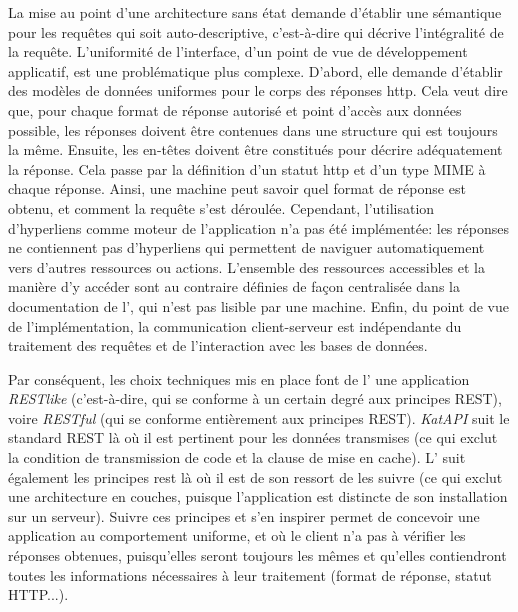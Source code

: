La mise au point d'une architecture sans état demande d'établir une sémantique pour les requêtes qui soit auto-descriptive, c'est-à-dire qui décrive l'intégralité de la requête. L'uniformité de l'interface, d'un point de vue de développement applicatif, est une problématique plus complexe. D'abord, elle demande d'établir des modèles de données uniformes pour le corps des réponses \gls{http}. Cela veut dire que, pour chaque format de réponse autorisé et point d'accès aux données possible, les réponses doivent être contenues dans une structure qui est toujours la même. Ensuite, les en-têtes doivent être constitués pour décrire adéquatement la réponse. Cela passe par la définition d'un statut \gls{http} et d'un type MIME à chaque réponse. Ainsi, une machine peut savoir quel format de réponse est obtenu, et comment la requête s'est déroulée. Cependant, l'utilisation d'hyperliens comme moteur de l'application n'a pas été implémentée: les réponses ne contiennent pas d'hyperliens qui permettent de naviguer automatiquement vers d'autres ressources ou actions. L'ensemble des ressources accessibles et la manière d'y accéder sont au contraire définies de façon centralisée dans la documentation de l'\api{}, qui n'est pas lisible par une machine. Enfin, du point de vue de l'implémentation, la communication client-serveur est indépendante du traitement des requêtes et de l'interaction avec les bases de données.

Par conséquent, les choix techniques mis en place font de l'\api{} une application \textit{RESTlike} (c'est-à-dire, qui se conforme à un certain degré aux principes REST), voire \textit{RESTful} (qui se conforme entièrement aux principes REST). \textit{KatAPI} suit le standard REST là où il est pertinent pour les données transmises (ce qui exclut la condition de transmission de code et la clause de mise en cache). L'\api{} suit également les principes \gls{rest} là où il est de son ressort de les suivre (ce qui exclut une architecture en couches, puisque l'application est distincte de son installation sur un serveur). Suivre ces principes et s'en inspirer permet de concevoir une application au comportement uniforme, et où le client n'a pas à vérifier les réponses obtenues, puisqu'elles seront toujours les mêmes et qu'elles contiendront toutes les informations nécessaires à leur traitement (format de réponse, statut HTTP...).

